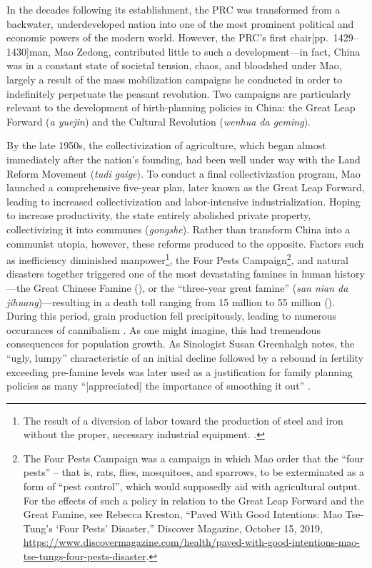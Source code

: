 \documentclass[12pt, a4paper, twoside]{article}
\begin{document}
In the decades following its establishment, the PRC was transformed from a backwater, underdeveloped nation into one of the most prominent political and economic powers of the modern world. However, the PRC’s first chair[pp.\ 1429--1430]man, Mao Zedong, contributed little to such a development---in fact, China was in a constant state of societal tension, chaos, and bloodshed under Mao, largely a result of the mass mobilization campaigns he conducted in order to indefinitely perpetuate the peasant revolution. Two campaigns are particularly relevant to the development of birth-planning policies in China: the Great Leap Forward (\emph{a yuejin}) and the Cultural Revolution (\emph{wenhua da geming}).

By the late 1950s, the collectivization of agriculture, which began almost immediately after the nation’s founding, had been well under way with the Land Reform Movement (\emph{tudi gaige}). To conduct a final collectivization program, Mao launched a comprehensive five-year plan, later known as the Great Leap Forward, leading to increased collectivization and labor-intensive industrialization. Hoping to increase productivity, the state entirely abolished private property, collectivizing it into communes (\emph{gongshe}). Rather than transform China into a communist utopia, however, these reforms produced to the opposite. Factors such as inefficiency \autocite{Britannica2024GreatLeapForward} diminished manpower\footnote{The result of a diversion of labor toward the production of steel and iron without the proper, necessary industrial equipment. \cite{Smil1999GreatFamine}.}, the Four Pests Campaign\footnote{The Four Pests Campaign was a campaign in which Mao order that the “four pests” – that is, rats, flies, mosquitoes, and sparrows, to be exterminated as a form of “pest control”, which would supposedly aid with agricultural output. For the effects of such a policy in relation to the Great Leap Forward and the Great Famine, see Rebecca Kreston, “Paved With Good Intentions: Mao Tse-Tung’s ‘Four Pests’ Disaster,” Discover Magazine, October 15, 2019, \url{https://www.discovermagazine.com/health/paved-with-good-intentions-mao-tse-tungs-four-pests-disaster}.}, and natural disasters together triggered one of the most devastating famines in human history---the Great Chinese Famine (\cites[pp.\ 51--73]{KungLin2003GreatLeapFamine}[pp.\ 125--140]{LinYang1998AgriculturalCrisis}), or the “three-year great famine” (\emph{san nian da jihuang})---resulting in a death toll ranging from 15 million to 55 million (\cites{Remais2023BerkeleyPublicHealth}[pp.\ 13--25]{ChenYixin2015}). During this period, grain production fell precipitously, leading to numerous occurances of cannibalism \autocite{Bernstein1997HiddenChineseFamine}. As one might imagine, this had tremendous consequences for population growth. As Sinologist Susan Greenhalgh notes, the “ugly, lumpy” characteristic of an initial decline followed by a rebound in fertility exceeding pre-famine levels was later used as a justification for family planning policies as many “[appreciated] the importance of smoothing it out” \autocite[pp.\ 113--114]{Greenhalgh2008JustOneChild}.
\end{document}
